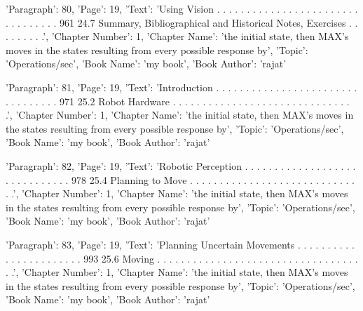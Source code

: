 {'Paragraph': 80, 'Page': 19, 'Text': 'Using Vision . . . . . . . . . . . . . . . . . . . . . . . . . . . . . . . . . 961 24.7 Summary, Bibliographical and Historical Notes, Exercises . . . . . . . . .', 'Chapter Number': 1, 'Chapter Name': 'the initial state, then MAX’s moves in the states resulting from every possible response by', 'Topic': 'Operations/sec', 'Book Name': 'my book', 'Book Author': 'rajat'}

{'Paragraph': 81, 'Page': 19, 'Text': 'Introduction . . . . . . . . . . . . . . . . . . . . . . . . . . . . . . . . . 971 25.2 Robot Hardware . . . . . . . . . . . . . . . . . . . . . . . . . . . . . . .', 'Chapter Number': 1, 'Chapter Name': 'the initial state, then MAX’s moves in the states resulting from every possible response by', 'Topic': 'Operations/sec', 'Book Name': 'my book', 'Book Author': 'rajat'}

{'Paragraph': 82, 'Page': 19, 'Text': 'Robotic Perception . . . . . . . . . . . . . . . . . . . . . . . . . . . . . . 978 25.4 Planning to Move . . . . . . . . . . . . . . . . . . . . . . . . . . . . . .', 'Chapter Number': 1, 'Chapter Name': 'the initial state, then MAX’s moves in the states resulting from every possible response by', 'Topic': 'Operations/sec', 'Book Name': 'my book', 'Book Author': 'rajat'}

{'Paragraph': 83, 'Page': 19, 'Text': 'Planning Uncertain Movements . . . . . . . . . . . . . . . . . . . . . . . 993 25.6 Moving . . . . . . . . . . . . . . . . . . . . . . . . . . . . . . . . . . . .', 'Chapter Number': 1, 'Chapter Name': 'the initial state, then MAX’s moves in the states resulting from every possible response by', 'Topic': 'Operations/sec', 'Book Name': 'my book', 'Book Author': 'rajat'}

